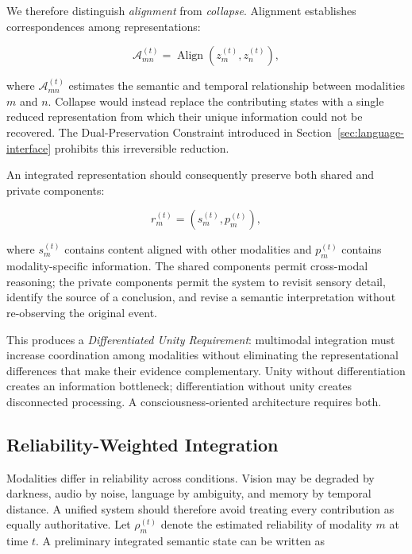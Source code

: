 We therefore distinguish \emph{alignment} from \emph{collapse}. Alignment establishes correspondences among representations:

\begin{equation}
\mathcal{A}_{mn}^{(t)}
=
\operatorname{Align}
\left(z_m^{(t)},z_n^{(t)}\right),
\label{eq:crossmodal-alignment}
\end{equation}

where $\mathcal{A}_{mn}^{(t)}$ estimates the semantic and temporal relationship between modalities $m$ and $n$. Collapse would instead replace the contributing states with a single reduced representation from which their unique information could not be recovered. The Dual-Preservation Constraint introduced in Section~\ref{sec:language-interface} prohibits this irreversible reduction.

An integrated representation should consequently preserve both shared and private components:

\begin{equation}
r_m^{(t)}
=
\left(s_m^{(t)},p_m^{(t)}\right),
\label{eq:shared-private-components}
\end{equation}

where $s_m^{(t)}$ contains content aligned with other modalities and $p_m^{(t)}$ contains modality-specific information. The shared components permit cross-modal reasoning; the private components permit the system to revisit sensory detail, identify the source of a conclusion, and revise a semantic interpretation without re-observing the original event.

This produces a \emph{Differentiated Unity Requirement}: multimodal integration must increase coordination among modalities without eliminating the representational differences that make their evidence complementary. Unity without differentiation creates an information bottleneck; differentiation without unity creates disconnected processing. A consciousness-oriented architecture requires both.

\subsection{Reliability-Weighted Integration}
\label{subsec:reliability-weighted-integration}

Modalities differ in reliability across conditions. Vision may be degraded by darkness, audio by noise, language by ambiguity, and memory by temporal distance. A unified system should therefore avoid treating every contribution as equally authoritative. Let $\rho_m^{(t)}$ denote the estimated reliability of modality $m$ at time $t$. A preliminary integrated semantic state can be written as

